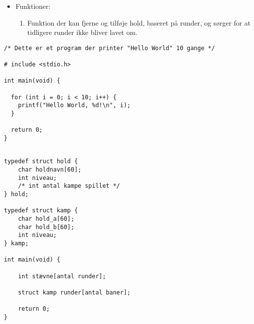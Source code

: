 \begin{itemize}
    \item Funktioner:
    \begin{enumerate}
        \item Funktion der kan fjerne og tilføje hold, baseret på runder, og sørger for at tidligere runder ikke bliver lavet om. 
    \end{enumerate}
    
\end{itemize}



\begin{verbatim}
/* Dette er et program der printer "Hello World" 10 gange */

# include <stdio.h>

int main(void) {
    
  for (int i = 0; i < 10; i++) {
    printf("Hello World, %d!\n", i);
  }
     
  return 0;
} 
\end{verbatim}

 
\begin{verbatim}

typedef struct hold {
    char holdnavn[60];
    int niveau;
    /* int antal kampe spillet */
} hold;

typedef struct kamp {
    char hold_a[60];
    char hold_b[60];
    int niveau;
} kamp;

int main(void) {

    int stævne[antal runder];
    
    struct kamp runder[antal baner];

    return 0;
}
\end{verbatim}